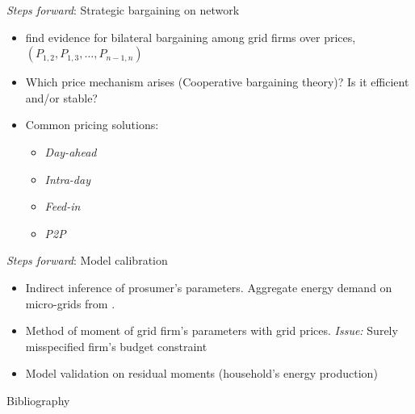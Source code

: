 \documentclass[xcolor={svgnames}]{beamer}
\begin{document}
\begin{frame}{\textit{Steps forward}: Strategic bargaining on network}
    \begin{itemize} \setlength\itemsep{1em}
        \item \citeauthor{Lopes2011} find evidence for bilateral bargaining among grid firms over prices, $(P_{1, 2}, P_{1, 3}, \ldots, P_{n-1, n})$
        \item Which price mechanism arises (Cooperative bargaining theory)? Is it efficient and/or stable?
        \item Common pricing solutions: \begin{itemize}\setlength\itemsep{0.5em}
                  \item \textit{Day-ahead}
                  \item \textit{Intra-day}
                  \item \textit{Feed-in}
                  \item \textit{P2P}
              \end{itemize}
    \end{itemize}
\end{frame}

\begin{frame}{\textit{Steps forward}: Model calibration}
    \begin{itemize}\setlength\itemsep{1em}
        \item Indirect inference of prosumer's parameters. Aggregate energy demand on micro-grids from \citeauthor{Fridgen2018}.
        \item Method of moment of grid firm's parameters with grid prices. \textit{Issue:} Surely misspecified firm's budget constraint
        \item Model validation on residual moments (household's energy production)
    \end{itemize}
\end{frame}
\endgroup


\begin{frame}[allowframebreaks]{Bibliography}
    \printbibliography
\end{frame}
\end{document}
